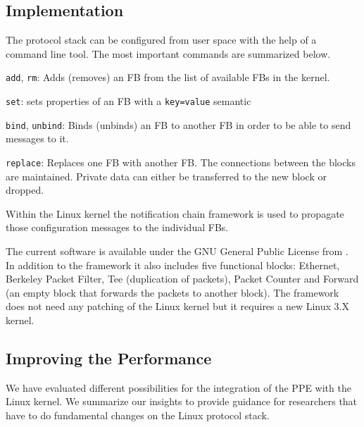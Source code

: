 \documentclass{sig-alternate}
\begin{document}
\subsection{Implementation}
The protocol stack can be configured from user space with the help of a 
command line tool. The most important commands are summarized below.
\begin{compactitem}
\item \texttt{add}, \texttt{rm}: Adds (removes) an FB from the 
      list of available FBs in the kernel. 
\item \texttt{set}: sets properties of an FB with a 
      \texttt{key=value} semantic
\item \texttt{bind}, \texttt{unbind}: Binds (unbinds) an FB 
      to another FB in order to be able to send messages to it. 
\item \texttt{replace}: Replaces one FB with another 
      FB. The connections between the blocks are maintained. 
      Private data can either be transferred to the new block or dropped.
\end{compactitem}
Within the Linux kernel the notification chain framework is used to propagate those configuration messages to the individual FBs. 

The current software is available under the GNU General Public License from 
\cite{lana}. In addition to the framework it also includes five functional 
blocks: Ethernet, Berkeley Packet Filter, Tee (duplication of packets), Packet 
Counter and Forward (an empty block that forwards the packets to 
another block). The framework does not need any patching of the Linux kernel
but it requires a new Linux 3.X kernel.

\subsection{Improving the Performance}
We have evaluated different possibilities for the integration of the PPE with the 
Linux kernel. We summarize our insights to provide guidance for researchers that have to do fundamental changes on the Linux protocol stack.
\end{document}
